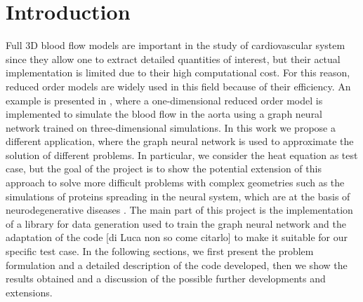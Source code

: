 \documentclass[11pt,a4paper]{article}
\begin{document}




\section{Introduction}
Full 3D blood flow models are important in the study of cardiovascular system since they allow one to extract detailed quantities of interest, but their actual implementation is limited due to their high computational cost. For this reason, reduced order models are widely used in this field because of their efficiency. An example is presented in \cite{Luca}, where a one-dimensional reduced order model is implemented to simulate the blood flow in the aorta using a graph neural network trained on three-dimensional simulations. In this work we propose a different application, where the graph neural network is used to approximate the solution of different problems. In particular, we consider the heat equation as test case, but the goal of the project is to show the potential extension of this approach to solve more difficult problems with complex geometries such as the simulations of proteins spreading in the neural system, which are at the basis of neurodegenerative diseases \cite{MattiaCorti}. The main part of this project is the implementation of a library for data generation used to train the graph neural network and the adaptation of the code [di Luca non so come citarlo] to make it suitable for our specific test case. In the following sections, we first present the problem formulation and a detailed description of the code developed, then we show the results obtained and a discussion of the possible further developments and extensions.

\end{document}
